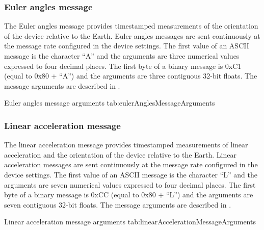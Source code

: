 \subsubsection{Euler angles message}

The Euler angles message provides timestamped measurements of the orientation of the device relative to the Earth.  Euler angles messages are sent continuously at the message rate configured in the device settings.  The first value of an \ac{ASCII} message is the character \enquote{A} and the arguments are three numerical values expressed to four decimal places.  The first byte of a binary message is 0xC1 (equal to 0x80 + \enquote{A}) and the arguments are three contiguous 32-bit floats.  The message arguments are described in .

\begingroup
    \def\tempArgumentA{Roll angle in degrees}
    \def\tempArgumentB{Pitch angle in degrees}
    \def\tempArgumentC{Yaw angle in degrees}
    \dataMessageTable
    {Euler angles message arguments}
    {tab:eulerAnglesMessageArguments}
\endgroup

\begingroup
    \def\tempNameA{Roll angle}
    \def\tempNameB{Pitch angle}
    \def\tempNameC{Yaw angle}
    \def\tempValueA{0}
    \def\tempValueB{0}
    \def\tempValueC{0}
    \def\tempAsciiFirst{A}
    \def\tempAsciiA{0.0000}
    \def\tempAsciiB{0.0000}
    \def\tempAsciiC{0.0000}
    \def\tempBinaryFirst{C1}
    \def\tempBinaryA{00 00 00 00}
    \def\tempBinaryB{00 00 00 00}
    \def\tempBinaryC{00 00 00 00}
    \dataMessageExample
\endgroup

\subsubsection{Linear acceleration message}

The linear acceleration message provides timestamped measurements of linear acceleration and the orientation of the device relative to the Earth.  Linear acceleration messages are sent continuously at the message rate configured in the device settings.  The first value of an \ac{ASCII} message is the character \enquote{L} and the arguments are seven numerical values expressed to four decimal places.  The first byte of a binary message is 0xCC (equal to 0x80 + \enquote{L}) and the arguments are seven contiguous 32-bit floats.  The message arguments are described in .

\begingroup
    \def\tempArgumentA{Quaternion W element}
    \def\tempArgumentB{Quaternion X element}
    \def\tempArgumentC{Quaternion Y element}
    \def\tempArgumentD{Quaternion Z element}
    \def\tempArgumentE{Linear acceleration X axis in g}
    \def\tempArgumentF{Linear acceleration Y axis in g}
    \def\tempArgumentG{Linear acceleration Z axis in g}
    \def\tempCaption{Linear acceleration message arguments}
    \def\tempLabel{tab:linearAccelerationMessageArguments}
    \dataMessageTable
    {Linear acceleration message arguments}
    {tab:linearAccelerationMessageArguments}
\endgroup

